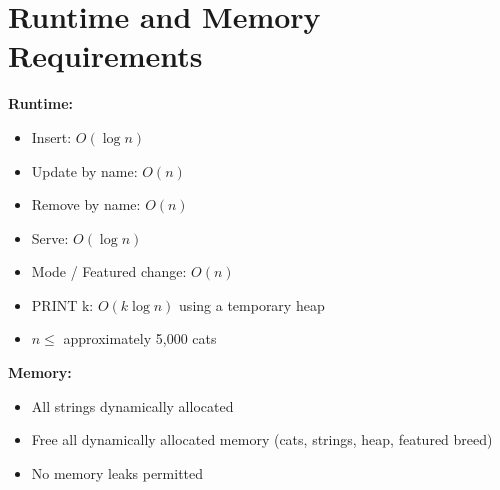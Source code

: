 \documentclass[11pt]{article}
\begin{document}
\section*{Runtime and Memory Requirements}
\textbf{Runtime:}
\begin{itemize}
    \item Insert: $O(\log n)$
    \item Update by name: $O(n)$
    \item Remove by name: $O(n)$
    \item Serve: $O(\log n)$
    \item Mode / Featured change: $O(n)$
    \item PRINT k: $O(k \log n)$ using a temporary heap
    \item $n \leq$ approximately 5,000 cats
\end{itemize}
\textbf{Memory:}
\begin{itemize}
    \item All strings dynamically allocated
    \item Free all dynamically allocated memory (cats, strings, heap, featured breed)
    \item No memory leaks permitted
\end{itemize}
\end{document}
